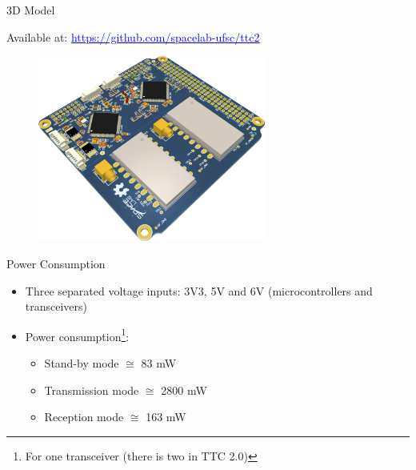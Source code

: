 \begin{frame}{3D Model}

    Available at: \href{https://github.com/spacelab-ufsc/ttc2/tree/master/hardware/outputs/board_3dmodels}{\textcolor{blue}{\underline{https://github.com/spacelab-ufsc/ttc2}}}

    \begin{figure}[!ht]
        \begin{center}
            \includegraphics[width=7.5cm]{figures/ttc2_pcb_3d.png}
        \end{center}
    \end{figure}

\end{frame}


\begin{frame}{Power Consumption}

    \begin{itemize}
        \item Three separated voltage inputs: 3V3, 5V and 6V (microcontrollers and transceivers)
        \vspace{0.5cm}
        \item Power consumption\footnote{For one transceiver (there is two in TTC 2.0)}:
            \begin{itemize}
                \item Stand-by mode $\cong$ 83 mW
                \vspace{0.3cm}
                \item Transmission mode $\cong$ 2800 mW
                \vspace{0.3cm}
                \item Reception mode $\cong$ 163 mW
            \end{itemize}
    \end{itemize}

\end{frame}

